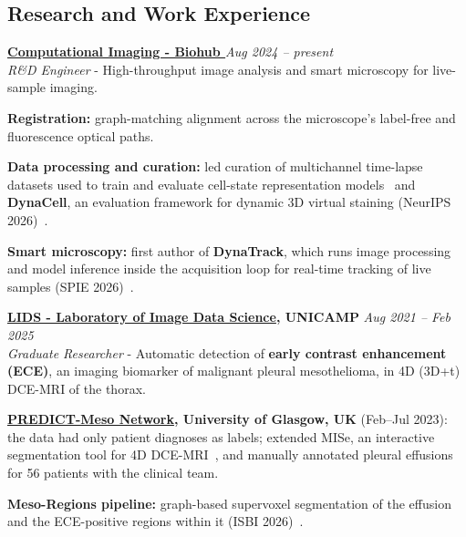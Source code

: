 \documentclass[margin,line]{resume}
\begin{document}
\begin{resume}
        \section{\mysidestyle Research and Work Experience} 
        \textbf{\href{https://www.czbiohub.org/comp-micro/people/}{Computational Imaging - Biohub
}} \hfill \textsl{Aug 2024 -- present}  \\
       \textit{R\&D Engineer} - High-throughput image analysis and smart microscopy for live-sample imaging.
       \begin{list2}
        \item \textbf{Registration:} graph-matching alignment across the microscope's label-free and fluorescence optical paths.
        \item \textbf{Data processing and curation:} led curation of multichannel time-lapse datasets used to train and evaluate cell-state representation models~\cite{pradeep2024contrastivelearningcellstate,hirata2025mapping,hirata-miyasaki2025embedding} and \textbf{DynaCell}, an evaluation framework for dynamic 3D virtual staining (NeurIPS 2026)~\cite{kalinin2026dynacell}.
        \item \textbf{Smart microscopy:} first author of \textbf{DynaTrack}, which runs image processing and model inference inside the acquisition loop for real-time tracking of live samples (SPIE 2026)~\cite{theodoro2026dynatrack}.
       \end{list2}
        \vspace{-0.3cm}

       \textbf{\href{https://lids.ic.unicamp.br/people}{LIDS - Laboratory of Image Data Science}, UNICAMP} \hfill \textsl{Aug 2021 -- Feb 2025}  \\
       \textit{Graduate Researcher} - Automatic detection of \textbf{early contrast enhancement (ECE)}, an imaging biomarker of malignant pleural mesothelioma, in 4D (3D+t) DCE-MRI of the thorax.
       \begin{list2}
        \item \textbf{\href{https://www.predictmeso.com/members/}{PREDICT-Meso Network}, University of Glasgow, UK} (Feb--Jul 2023): the data had only patient diagnoses as labels; extended MISe, an interactive segmentation tool for 4D DCE-MRI~\cite{mise2023}, and manually annotated pleural effusions for 56 patients with the clinical team.
        \item \textbf{Meso-Regions pipeline:} graph-based supervoxel segmentation of the effusion and the ECE-positive regions within it (ISBI 2026)~\cite{11515662, theodoro2025mesothelioma,9643120,ARMATO2024107832}.
       \end{list2}
        \vspace{-0.3cm}


\end{resume}
\end{document}
